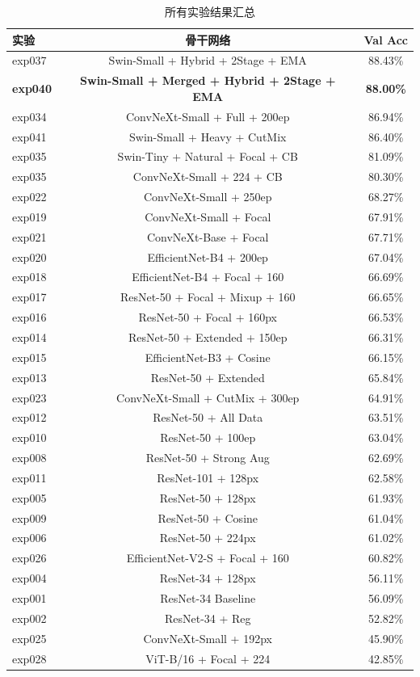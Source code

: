 \documentclass[12pt,a4paper]{article}
\begin{document}
\begin{table}[H]
\centering
\caption{所有实验结果汇总}
\label{tab:all_exp}
\small
\begin{tabular}{lcc}
\toprule
\textbf{实验} & \textbf{骨干网络} & \textbf{Val Acc} \\
\midrule
exp037 & Swin-Small + Hybrid + 2Stage + EMA & 88.43\% \\
\textbf{exp040} & \textbf{Swin-Small + Merged + Hybrid + 2Stage + EMA} & \textbf{88.00\%} \\
exp034 & ConvNeXt-Small + Full + 200ep & 86.94\% \\
exp041 & Swin-Small + Heavy + CutMix & 86.40\% \\
exp035 & Swin-Tiny + Natural + Focal + CB & 81.09\% \\
exp035 & ConvNeXt-Small + 224 + CB & 80.30\% \\
exp022 & ConvNeXt-Small + 250ep & 68.27\% \\
exp019 & ConvNeXt-Small + Focal & 67.91\% \\
exp021 & ConvNeXt-Base + Focal & 67.71\% \\
exp020 & EfficientNet-B4 + 200ep & 67.04\% \\
exp018 & EfficientNet-B4 + Focal + 160 & 66.69\% \\
exp017 & ResNet-50 + Focal + Mixup + 160 & 66.65\% \\
exp016 & ResNet-50 + Focal + 160px & 66.53\% \\
exp014 & ResNet-50 + Extended + 150ep & 66.31\% \\
exp015 & EfficientNet-B3 + Cosine & 66.15\% \\
exp013 & ResNet-50 + Extended & 65.84\% \\
exp023 & ConvNeXt-Small + CutMix + 300ep & 64.91\% \\
exp012 & ResNet-50 + All Data & 63.51\% \\
exp010 & ResNet-50 + 100ep & 63.04\% \\
exp008 & ResNet-50 + Strong Aug & 62.69\% \\
exp011 & ResNet-101 + 128px & 62.58\% \\
exp005 & ResNet-50 + 128px & 61.93\% \\
exp009 & ResNet-50 + Cosine & 61.04\% \\
exp006 & ResNet-50 + 224px & 61.02\% \\
exp026 & EfficientNet-V2-S + Focal + 160 & 60.82\% \\
exp004 & ResNet-34 + 128px & 56.11\% \\
exp001 & ResNet-34 Baseline & 56.09\% \\
exp002 & ResNet-34 + Reg & 52.82\% \\
exp025 & ConvNeXt-Small + 192px & 45.90\% \\
exp028 & ViT-B/16 + Focal + 224 & 42.85\% \\
\bottomrule
\end{tabular}
\end{table}
\end{document}
